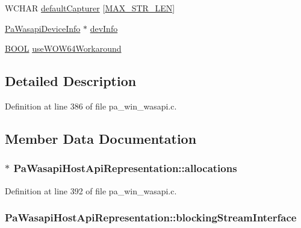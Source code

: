 \begin{DoxyCompactItemize}
W\+C\+H\+AR \hyperlink{struct_pa_wasapi_host_api_representation_a477fff22f034072694329b480fb8d8b8}{default\+Capturer} \mbox{[}\hyperlink{pa__win__wasapi_8c_a58ce36916c399104e18d32ff090f21c6}{M\+A\+X\+\_\+\+S\+T\+R\+\_\+\+L\+EN}\mbox{]}
\item 
\hyperlink{struct_pa_wasapi_device_info}{Pa\+Wasapi\+Device\+Info} $\ast$ \hyperlink{struct_pa_wasapi_host_api_representation_a69ec6c1449ce660d84a4d4d0653faf3e}{dev\+Info}
\item 
\hyperlink{nfilterkit_8h_a3be13892ae7076009afcf121347dd319}{B\+O\+OL} \hyperlink{struct_pa_wasapi_host_api_representation_a1fe6be6a2edf0292a0a3d6f55cf83fc6}{use\+W\+O\+W64\+Workaround}
\end{DoxyCompactItemize}


\subsection{Detailed Description}


Definition at line 386 of file pa\+\_\+win\+\_\+wasapi.\+c.



\subsection{Member Data Documentation}
\subsubsection[{\texorpdfstring{allocations}{allocations}}]{$\ast$ Pa\+Wasapi\+Host\+Api\+Representation\+::allocations}\hypertarget{struct_pa_wasapi_host_api_representation_a618f5cbefb32d51edcda7dd12905ddf2}{}\label{struct_pa_wasapi_host_api_representation_a618f5cbefb32d51edcda7dd12905ddf2}


Definition at line 392 of file pa\+\_\+win\+\_\+wasapi.\+c.

\subsubsection[{\texorpdfstring{blocking\+Stream\+Interface}{blockingStreamInterface}}]{ Pa\+Wasapi\+Host\+Api\+Representation\+::blocking\+Stream\+Interface}\hypertarget{struct_pa_wasapi_host_api_representation_ace80cce61f9d475d6c4f2af80cb2933d}{}\label{struct_pa_wasapi_host_api_representation_ace80cce61f9d475d6c4f2af80cb2933d}


